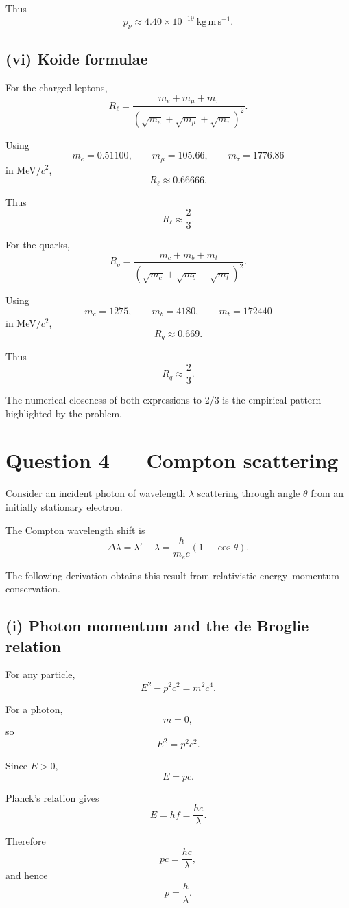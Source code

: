 \documentclass[11pt,a4paper]{article}
\begin{document}
Thus
\[
\boxed{p_\nu\approx4.40\times10^{-19}\ \mathrm{kg\,m\,s^{-1}}}.
\]

\subsection{(vi) Koide formulae}

For the charged leptons,
\[
R_\ell
=
\frac{m_e+m_\mu+m_\tau}
{\left(\sqrt{m_e}+\sqrt{m_\mu}+\sqrt{m_\tau}\right)^2}.
\]

Using
\[
m_e=0.51100,\qquad
m_\mu=105.66,\qquad
m_\tau=1776.86
\]
in MeV$/c^2$,
\[
R_\ell\approx0.66666.
\]

Thus
\[
\boxed{R_\ell\approx\frac23}.
\]

For the quarks,
\[
R_q
=
\frac{m_c+m_b+m_t}
{\left(\sqrt{m_c}+\sqrt{m_b}+\sqrt{m_t}\right)^2}.
\]

Using
\[
m_c=1275,\qquad
m_b=4180,\qquad
m_t=172440
\]
in MeV$/c^2$,
\[
R_q\approx0.669.
\]

Thus
\[
\boxed{R_q\approx\frac23}.
\]

The numerical closeness of both expressions to $2/3$ is the empirical pattern
highlighted by the problem.

\section{Question 4 --- Compton scattering}

Consider an incident photon of wavelength $\lambda$ scattering through angle
$\theta$ from an initially stationary electron.

The Compton wavelength shift is
\[
\boxed{
\Delta\lambda
=
\lambda'-\lambda
=
\frac{h}{m_ec}(1-\cos\theta)
}.
\]

The following derivation obtains this result from relativistic energy--momentum
conservation.

\subsection{(i) Photon momentum and the de Broglie relation}

For any particle,
\[
E^2-p^2c^2=m^2c^4.
\]

For a photon,
\[
m=0,
\]
so
\[
E^2=p^2c^2.
\]

Since $E>0$,
\[
E=pc.
\]

Planck's relation gives
\[
E=hf=\frac{hc}{\lambda}.
\]

Therefore
\[
pc=\frac{hc}{\lambda},
\]
and hence
\[
\boxed{p=\frac h\lambda}.
\]
\end{document}
